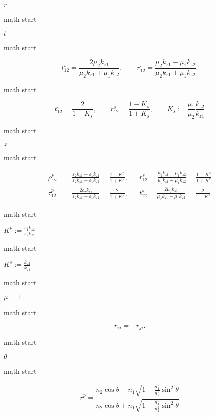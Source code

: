 \(r\)

math start

\(t\)

math start

\[t_{12}^s=\frac{2\mu_2 k_{z1}}{\mu_2 k_{z1}+\mu_1k_{z2}},\qquad r_{12}^s=\frac{\mu_2 k_{z1}-\mu_1k_{z2}}{\mu_2 k_{z1}+\mu_1k_{z2}}.\]

math start

\[t_{12}^s=\frac{2}{1+K_s},\qquad r_{12}^s=\frac{1 - K_s}{1 + K_s},\qquad K_s:=\frac{\mu_1}{\mu_2}\frac{k_{z2}}{k_{z1}}\]

math start

\(z\)

math start

\[\begin{aligned}
    \rho_{12}^p & =\frac{\varepsilon_2 k_{z1}-\varepsilon_1k_{z2}}{\varepsilon_2 k_{z1}+\varepsilon_1k_{z2}} = \frac{1-K^p}{1+K^p},%
    & {}& r_{12}^s=\frac{\mu_2 k_{z1}-\mu_1k_{z2}}{\mu_2 k_{z1}+\mu_1k_{z2}} = \frac{1-K^s}{1+K^s}\\
    \tau_{12}^p &=\frac{2\varepsilon_2 k_{z1}}{\varepsilon_2 k_{z1}+\varepsilon_1k_{z2}} = \frac{2}{1+K^p},%
    &{}& t_{12}^s=\frac{2\mu_2 k_{z1}}{\mu_2 k_{z1}+\mu_1k_{z2}} = \frac{2}{1+K^s}
    \end{aligned}\]

math start

\(K^p:= \frac{\varepsilon_1 k_{z2}}{\varepsilon_2 k_{z1}}\)

math start

\(K^s:= \frac{ k_{z2}}{ k_{z1}}\)

math start

\(\mu=1\)

math start

\[r_{ij}=-r_{ji}.\]

math start

\(\theta\)

math start

\[r^{p}=\frac{n_{2} \cos \theta-n_{1} \sqrt{1-\frac{n_{1}^{2}}{n_{2}^{2}} \sin ^{2} \theta}}{n_{2} \cos \theta+n_{1} \sqrt{1-\frac{n_{1}^{2}}{n_{2}^{2}} \sin ^{2} \theta}}\]
